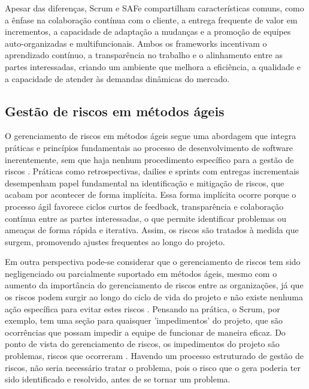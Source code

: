 \documentclass[
	12pt,
	openright,
	twoside,
	a4paper,
	english,
	brazil
	]{abntex2}
\begin{document}
Apesar das diferenças, Scrum e SAFe compartilham características comuns, como a ênfase na colaboração contínua com o cliente, a entrega frequente de valor em incrementos, a capacidade de adaptação a mudanças e a promoção de equipes auto-organizadas e multifuncionais. Ambos os frameworks incentivam o aprendizado contínuo, a transparência no trabalho e o alinhamento entre as partes interessadas, criando um ambiente que melhora a eficiência, a qualidade e a capacidade de atender às demandas dinâmicas do mercado.


\subsection{Gestão de riscos em métodos ágeis}

O gerenciamento de riscos em métodos ágeis segue uma abordagem que integra práticas e princípios fundamentais ao processo de desenvolvimento de software inerentemente, sem que haja nenhum procedimento específico para a gestão de riscos \cite{Gold}. Práticas como retrospectivas, dailies e sprints com entregas incrementais desempenham papel fundamental na identificação e mitigação de riscos, que acabam por acontecer de forma implícita. Essa forma implícita ocorre porque o processo ágil favorece ciclos curtos de feedback, transparência e colaboração contínua entre as partes interessadas, o que permite identificar problemas ou ameaças de forma rápida e iterativa. Assim, os riscos são tratados à medida que surgem, promovendo ajustes frequentes ao longo do projeto.

Em outra perspectiva pode-se considerar que o gerenciamento de riscos tem sido negligenciado ou parcialmente suportado em métodos ágeis, mesmo com o aumento da importância do gerenciamento de riscos entre as organizações, já que os riscos podem surgir ao longo do ciclo de vida do projeto e não existe nenhuma ação específica para evitar estes riscos \cite{LopesSamueldeSouza2022ARMF}. Pensando na prática, o Scrum, por exemplo, tem uma seção para quaisquer 'impedimentos' do projeto, que são ocorrências que possam impedir a equipe de funcionar de maneira eficaz. Do ponto de vista do gerenciamento de riscos, os impedimentos do projeto são problemas, riscos que ocorreram \cite{Gold}. Havendo um processo estruturado de gestão de riscos, não seria necessário tratar o problema, pois o risco que o gera poderia ter sido identificado e resolvido, antes de se tornar um problema.
\end{document}
